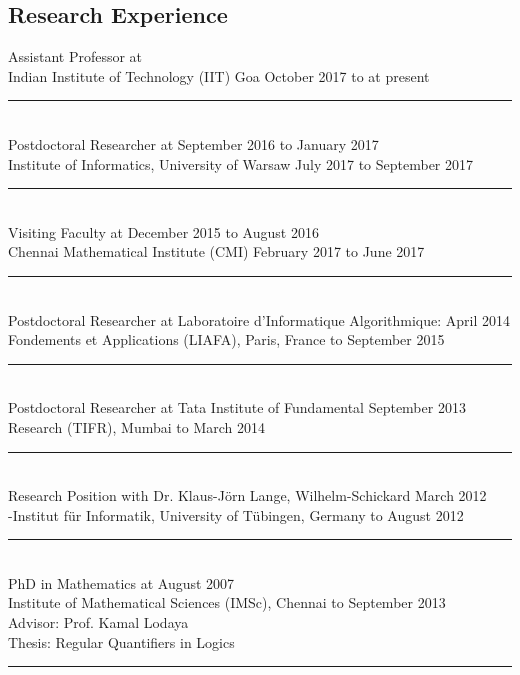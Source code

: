 \documentclass[margin]{res}
\begin{document}
\begin{resume}
\section{Research Experience} 
					Assistant Professor at \\
					Indian Institute of Technology (IIT) Goa \hfill October 2017 to at present \\
					\noindent\rule{13cm}{0.4pt} \\
					Postdoctoral Researcher at \hfill  \hfill September 2016 to January 2017 \\
					Institute of Informatics, University of Warsaw \hfill July 2017 to September 2017 \\
					\noindent\rule{13cm}{0.4pt} \\
					Visiting Faculty at 	\hfill December 2015 to August 2016 \\
					Chennai Mathematical Institute (CMI)  \hfill  February 2017 to June 2017 \\
					\noindent\rule{13cm}{0.4pt} \\
					Postdoctoral Researcher  at Laboratoire d{'}Informatique Algorithmique: \hfill April 2014\\
					Fondements et Applications (LIAFA),	Paris, France \hfill to September 2015 \\
					\noindent\rule{13cm}{0.4pt} \\
					Postdoctoral Researcher  at Tata Institute of  Fundamental \hfill September 2013 \\
					Research (TIFR), Mumbai	\hfill	to March 2014
					\noindent\rule{13cm}{0.4pt} \\					
					Research Position with Dr. Klaus-J\"orn Lange, Wilhelm-Schickard \hfill March 2012\\
					-Institut f\"ur Informatik, University of T\"ubingen, Germany \hfill to August 2012 
					\noindent\rule{13cm}{0.4pt} \\
					PhD in Mathematics at \hfill August 2007\\
					Institute of Mathematical Sciences (IMSc), Chennai \hfill to September 2013\\
					Advisor: Prof. Kamal Lodaya  \\
					Thesis: Regular Quantifiers in Logics  \\
					\noindent\rule{13cm}{0.4pt} 



\end{resume}
\end{document}
